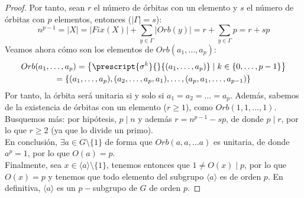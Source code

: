 \begin{teo}[de Cauchy]
\begin{proof}
        \noindent
        Por tanto, sean $r$ el número de órbitas con un elemento y $s$ el número de órbitas con $p$ elementos, entonces ($|\Gamma| = s$):
        \begin{equation*}
            n^{p-1} = |X| = |Fix(X)| + \sum_{y\in \Gamma} |Orb(y)| = r + \sum_{y\in \Gamma} p = r + sp
        \end{equation*}
        Veamos ahora cómo son los elementos de $Orb(a_1,\ldots,a_p)$:
        \begin{multline*}
            Orb(a_1,\ldots,a_p) = \left\{\prescript{\sigma^k}{}{(a_1,\ldots,a_p)} \mid k\in \{0,\ldots,p-1\}\right\} \\
            = \{(a_1,\ldots,a_p), (a_2, \ldots, a_p, a_1), \ldots, (a_p, a_1, \ldots, a_{p-1})\}
        \end{multline*}
        Por tanto, la órbita será unitaria si y solo si $a_1 = a_2 = \ldots = a_p$. Además, sabemos de la existencia de órbitas con un elemento ($r\geq 1$), como $Orb(1,1,\ldots,1)$. Busquemos más: por hipótesis, $p \mid n$ y además $r = n^{p-1}-sp $, de donde $p\mid r$, por lo que $r\geq 2$ (ya que lo divide un primo).\\

        \noindent
        En conclusión, $\exists a\in G\setminus \{1\}$ de forma que $Orb(a,a,\ldots a)$ es unitaria, de donde $a^p = 1$, por lo que $O(a) = p$.\\

        \noindent
        Finalmente, sea $x\in \langle a \rangle \setminus \{1\}$, tenemos entonces que $1 \neq O(x) \mid p$, por lo que $O(x) = p$ y tenemos que todo elemento del subgrupo $\langle a \rangle $ es de orden $p$. En definitiva, $\langle a \rangle $ es un $p-$subgrupo de $G$ de orden $p$.
    \end{proof}
\end{teo}

